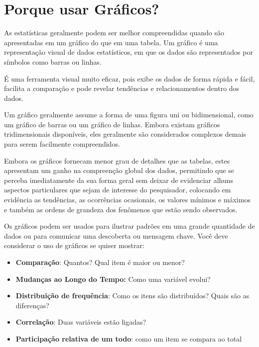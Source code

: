 \section{Porque usar Gráficos?}

As estatísticas geralmente podem ser melhor compreendidas quando são apresentadas em um gráfico do que em uma tabela. Um gráfico é uma representação visual de dados estatísticos, em que os dados são representados por símbolos como barras ou linhas.
\vskip0.3cm  

É uma ferramenta visual muito eficaz, pois exibe os dados de forma rápida e fácil, facilita a comparação e pode revelar tendências e relacionamentos dentro dos dados.\vskip0.3cm  

Um gráfico geralmente assume a forma de uma figura uni ou bidimensional, como um gráfico de barras ou um gráfico de linhas. Embora existam gráficos tridimensionais disponíveis, eles geralmente são considerados complexos demais para serem facilmente compreendidos.\vskip0.3cm  

Embora os gráficos fornecam menor grau de detalhes que as tabelas, estes apresentam um ganho na compreenção global dos dados, permitindo que se perceba imediatamente da sua forma geral sem deixar de evidenciar alhuns aspectos particulares que sejam de interesse do pesquisador, colocando em evidência as tendências, as ocorrências ocasionais, os valores mínimos e máximos e também as ordens de grandeza dos fenômenos que estão sendo observados.\vskip0.3cm



\newpage
Os gráficos podem ser usados para ilustrar padrões em uma grande quantidade de dados ou para comunicar uma descoberta ou mensagem chave. Você deve considerar o uso de gráficos se quiser mostrar:

\begin{itemize}
    \item \textbf{Comparação}: Quantos? Qual item é maior ou menor?
    \item \textbf{Mudanças ao Longo do Tempo:} Como uma variável evolui?
    \item \textbf{Distribuição de frequência}: Como os itens são distribuídos? Quais são as diferenças?
    \item \textbf{Correlação}: Duas variáveis estão ligadas?
    \item \textbf{Participação relativa de um todo}: como um item se compara ao total
\end{itemize}


